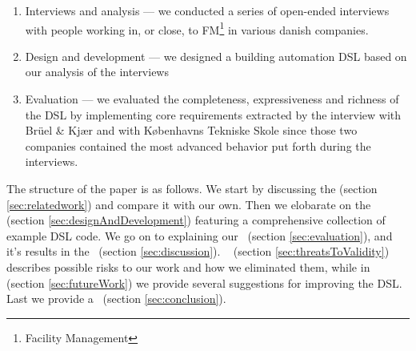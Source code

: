 \begin{enumerate}
	\item Interviews and analysis --- we conducted a series of open-ended interviews with people working in, or close, to FM\footnote{Facility Management} in various danish companies.
	\item Design and development --- we designed a building automation DSL based on our analysis of the interviews
	\item Evaluation --- we evaluated the completeness, expressiveness and richness of the DSL by implementing core requirements extracted by the interview with Br\"{u}el \& Kj\ae r and with K\o benhavns Tekniske Skole since those two companies contained the most advanced behavior put forth during the interviews.
\end{enumerate}

The structure of the paper is as follows. We start by discussing the  (section \ref{sec:relatedwork}) and compare it with our own. Then we elobarate on the~  (section \ref{sec:designAndDevelopment}) featuring a comprehensive collection of example DSL code. We go on to explaining our~  (section \ref{sec:evaluation}), and it's results in the~ (section \ref{sec:discussion}). ~ (section \ref{sec:threatsToValidity}) describes possible risks to our work and how we eliminated them, while in ~ (section \ref{sec:futureWork}) we provide several suggestions for improving the DSL. Last we provide a~ (section \ref{sec:conclusion}).